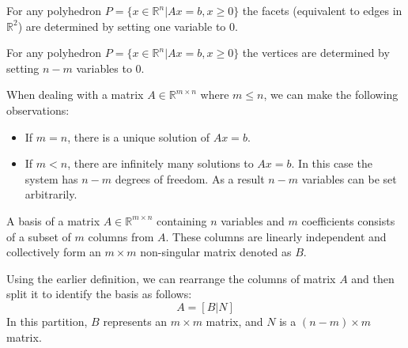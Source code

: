 \begin{property}
    For any polyhedron $P = \{x \in \mathbb{R}^n|Ax = b,x \geq 0\}$ the facets (equivalent to edges in $\mathbb{R}^2$) are determined by setting one variable to 0. 
\begin{property}   
    For any polyhedron $P = \{x \in \mathbb{R}^n|Ax = b,x \geq 0\}$ the vertices are determined by setting $n-m$ variables to 0. 
\end{property}

When dealing with a matrix  $A \in \mathbb{R}^{m \times n}$ where $m \leq n$, we can make the following observations:
\begin{itemize}
    \item If $m=n$, there is a unique solution of $Ax = b$.
    \item If $m<n$, there are infinitely many solutions to $Ax = b$. 
        In this case the system has $n-m$ degrees of freedom. 
        As a result $n-m$ variables can be set arbitrarily. 
\end{itemize}
\begin{definition}
    A basis of a matrix $A \in \mathbb{R}^{m \times n}$ containing $n$ variables and $m$ coefficients consists of a subset of $m$ columns from $A$. 
    These columns are linearly independent and collectively form an $m \times m$ non-singular matrix denoted as $B$. 
\end{definition}
Using the earlier definition, we can rearrange the columns of matrix $A$ and then split it to identify the basis as follows:
\[A=\left[ B|N \right]\]
In this partition, $B$ represents an $m \times m$ matrix, and $N$ is a $(n-m) \times m$ matrix.


\end{property}
